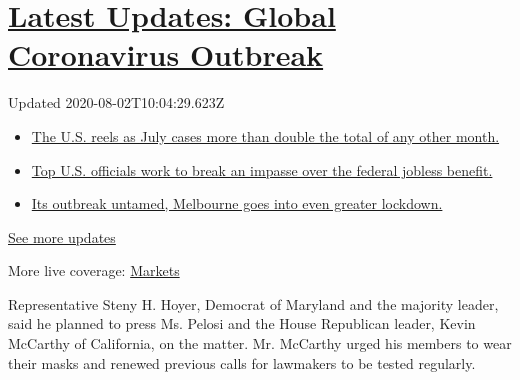 \hypertarget{latest-updates-global-coronavirus-outbreak}{%
\section{\texorpdfstring{\href{https://www.nytimes.com/2020/08/01/world/coronavirus-covid-19.html?action=click\&pgtype=Article\&state=default\&region=MAIN_CONTENT_1\&context=storylines_live_updates}{Latest
Updates: Global Coronavirus
Outbreak}}{Latest Updates: Global Coronavirus Outbreak}}\label{latest-updates-global-coronavirus-outbreak}}

Updated 2020-08-02T10:04:29.623Z

\begin{itemize}
\tightlist
\item
  \href{https://www.nytimes.com/2020/08/01/world/coronavirus-covid-19.html?action=click\&pgtype=Article\&state=default\&region=MAIN_CONTENT_1\&context=storylines_live_updates\#link-34047410}{The
  U.S. reels as July cases more than double the total of any other
  month.}
\item
  \href{https://www.nytimes.com/2020/08/01/world/coronavirus-covid-19.html?action=click\&pgtype=Article\&state=default\&region=MAIN_CONTENT_1\&context=storylines_live_updates\#link-780ec966}{Top
  U.S. officials work to break an impasse over the federal jobless
  benefit.}
\item
  \href{https://www.nytimes.com/2020/08/01/world/coronavirus-covid-19.html?action=click\&pgtype=Article\&state=default\&region=MAIN_CONTENT_1\&context=storylines_live_updates\#link-2bc8948}{Its
  outbreak untamed, Melbourne goes into even greater lockdown.}
\end{itemize}

\href{https://www.nytimes.com/2020/08/01/world/coronavirus-covid-19.html?action=click\&pgtype=Article\&state=default\&region=MAIN_CONTENT_1\&context=storylines_live_updates}{See
more updates}

More live coverage:
\href{https://www.nytimes.com/live/2020/07/31/business/stock-market-today-coronavirus?action=click\&pgtype=Article\&state=default\&region=MAIN_CONTENT_1\&context=storylines_live_updates}{Markets}

Representative Steny H. Hoyer, Democrat of Maryland and the majority
leader, said he planned to press Ms. Pelosi and the House Republican
leader, Kevin McCarthy of California, on the matter. Mr. McCarthy urged
his members to wear their masks and renewed previous calls for lawmakers
to be tested regularly.

